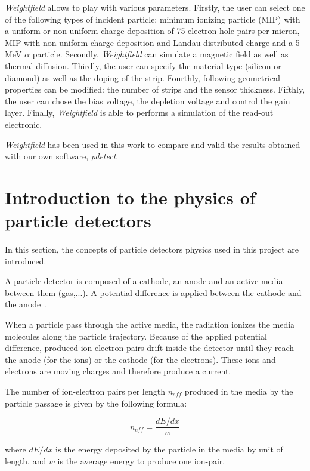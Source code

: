 \documentclass[11pt]{article}
\begin{document}
		\textit{Weightfield} allows to play with various parameters. Firstly, the user
		can select one of the following types of incident particle:
		minimum ionizing particle (MIP) with a uniform or non-uniform charge deposition of 75
		electron-hole pairs per micron, MIP with non-uniform charge deposition and
		Landau distributed charge and a 5 MeV $\alpha$ particle. Secondly, \textit{Weightfield}
		can simulate a magnetic field as well as thermal diffusion. Thirdly, the user
		can specify the material type (silicon or diamond) as well as the doping
		of the strip. Fourthly, following geometrical properties can be modified:
		the number of strips and the sensor thickness. Fifthly, the user can
		chose the bias voltage, the depletion voltage and control the gain layer. Finally,
		\textit{Weightfield} is able to performs a simulation of the read-out
		electronic.

		\textit{Weightfield} has been used in this work to compare and valid the results
		obtained with our own software, \textit{pdetect}.

\section{Introduction to the physics of particle detectors}

	\label{equations}

	In this section, the concepts of particle detectors physics used in this project
	are introduced.

	A particle detector is composed of a cathode, an anode and an active media
	between them (gas,...). A potential difference is applied between the cathode
	and the anode~\cite{lphy2236}.

	When a particle pass through the active media, the radiation ionizes the media
	molecules along the particle trajectory.
	Because of the applied potential difference,
	produced ion-electron pairs drift inside the detector until they reach the anode
	(for the ions) or the cathode (for the electrons). These ions and electrons
	are moving charges and therefore produce a current.

	The number of ion-electron pairs per length $n_{eff}$ produced in the media by the
	particle passage is given by the following formula:

	\[n_{eff} = \frac{dE/dx}{w} \]

	where $dE/dx$ is the energy deposited by the particle in the media by
	unit of length, and $w$ is the average energy to produce one ion-pair.
\end{document}
